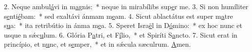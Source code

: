 2. Neque ambul\uline{á}vi in m\uline{a}gnis:~* neque in mirabílibs sup\uline{e}r me.
3. Si non humíliter s\uline{e}nti\uline{é}bam:~* sed exaltávi ánmam m\uline{e}am.
4. Sicut ablactátus est super m\uline{a}tre s\uline{u}a:~* ita retribútio in ánma m\uline{e}a.
5. Speret Isra\uline{ë}l in D\uline{ó}mino:~* ex hoc nunc et usque n sǽc\uline{u}lum.
6. Glória P\uline{a}tri, et F\uline{í}lio,~* et Spiríti S\uline{a}ncto.
7. Sicut erat in princípio, et n\uline{u}nc, et s\uline{e}mper,~* et in sǽcula sæculrum. \uline{A}men.
